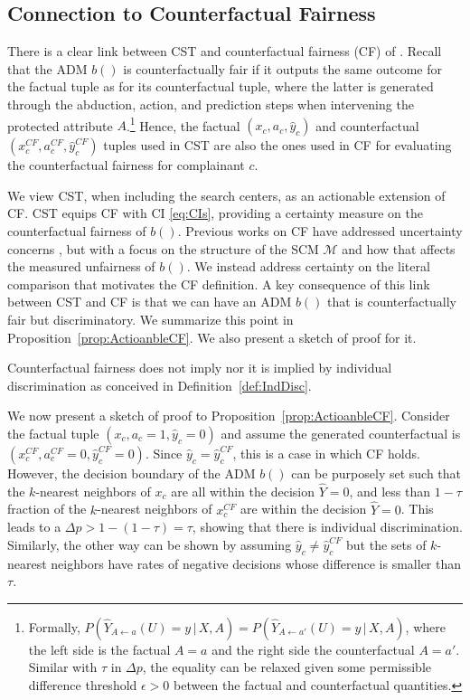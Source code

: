 \subsection{Connection to Counterfactual Fairness}
\label{sec:CST.OnCF}

There is a clear link between CST and counterfactual fairness (CF) of \textcite{Kusner2017CF}.
Recall that the ADM $b()$ is counterfactually fair if it outputs the same outcome for the factual tuple as for its counterfactual tuple, where the latter is generated through the abduction, action, and prediction steps when intervening the protected attribute $A$.\footnote{Formally, $P(\hat{Y}_{A \leftarrow a}(U)=y \, | \, X, A) = P(\hat{Y}_{A \leftarrow a'}(U)=y \, | \, X, A)$, where the left side is the factual $A=a$ and the right side the counterfactual $A=a'$. Similar with $\tau$ in $\Delta p$, the equality can be relaxed given some permissible difference threshold $\epsilon > 0$ between the factual and counterfactual quantities.} 
Hence, the factual $(x_c, a_c, \hat{y}_c)$ and counterfactual $(x_c^{CF}, a_c^{CF}, \hat{y}_c^{CF})$ tuples used in CST are also the ones used in CF for evaluating the counterfactual fairness for complainant $c$.

We view CST, when including the search centers, as an actionable extension of CF.
CST equips CF with CI \eqref{eq:CIs}, providing a certainty measure on the counterfactual fairness of $b()$. 
Previous works on CF have addressed uncertainty concerns \parencite{DBLP:conf/nips/RussellKLS17, DBLP:conf/uai/KilbertusBKWS19}, but with a focus on the structure of the SCM $\mathcal{M}$ and how that affects the measured unfairness of $b()$. 
We instead address certainty on the literal comparison that motivates the CF definition.
A key consequence of this link between CST and CF is that we can have an ADM $b()$ that is counterfactually fair but discriminatory. 
We summarize this point in Proposition~\ref{prop:ActioanbleCF}. 
We also present a sketch of proof for it.

%
\begin{proposition}
\label{prop:ActioanbleCF} 
    Counterfactual fairness does not imply nor it is implied by individual discrimination as conceived in Definition~\ref{def:IndDisc}.
\end{proposition}
%

We now present a sketch of proof to Proposition~\ref{prop:ActioanbleCF}.
Consider the factual tuple $(x_c, a_c=1, \widehat{y}_c=0)$ and assume the generated counterfactual is $(x_c^{CF}, a_c^{CF}=0, \widehat{y}_c^{CF}=0)$. 
Since $\widehat{y}_c = \widehat{y}_c^{CF}$, this is a case in which CF holds. However, the decision boundary of the ADM $b()$ can be purposely set such that the $k$-nearest neighbors of $x_c$ are all within the decision $\hat{Y}=0$, and less than $1-\tau$ fraction of the $k$-nearest neighbors of $x_c^{CF}$ are within the decision $\hat{Y}=0$. 
This leads to a $\Delta p > 1-(1-\tau) = \tau$, showing that there is individual discrimination. 
Similarly, the other way can be shown by assuming $\widehat{y}_c \neq \widehat{y}_c^{CF}$ but the sets of $k$-nearest neighbors have rates of negative decisions whose difference is smaller than $\tau$.

